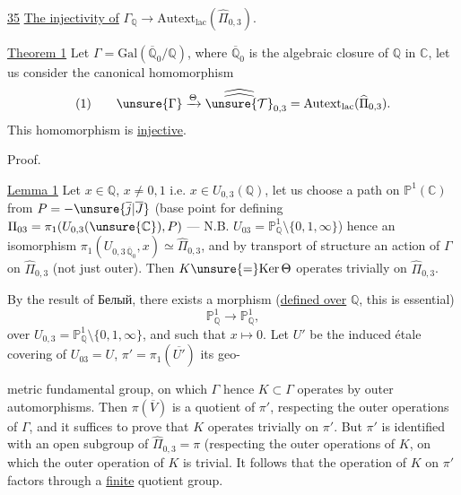 
\uline{35} \uline{The injectivity of} $\Gamma_{\mathbb Q}\longrightarrow\mathrm{Autext}_{\mathrm{lac}}(\widehat{\Pi}_{0,3})$.


\uline{Theorem 1} Let $\Gamma=\mathrm{Gal}(\overline{\mathbb Q}_0/\mathbb Q)$, where $\overline{\mathbb Q}_0$ is the algebraic closure of $\mathbb Q$ in $\mathbb C$, let us consider the canonical homomorphism
\[
(1)\qquad \unsure{\Gamma}\xrightarrow{\Theta}\widehat{\widehat{\unsure{\mathcal T}}}_{0,3}=\mathrm{Autext}_{\mathrm{lac}}(\widehat{\Pi}_{0,3}).
\]
This homomorphism is \uline{injective}.

Proof.

\uline{Lemma 1} Let $x\in\mathbb Q$, $x\ne0,1$ i.e. $x\in U_{0,3}(\mathbb Q)$, let us choose a  path on $\mathbb P^1(\mathbb C)$ from $P=-\unsure{\overline{j}|\overline{J}}$ (base point for defining $\Pi_{03}=\pi_1(U_{0,3}(\unsure{\mathbb C}),P)$ --- N.B. $U_{03}=\mathbb P^1_{\mathbb Q}\setminus\{0,1,\infty\}$) hence an isomorphism $\pi_1(U_{0,3\,\overline{\mathbb Q}_0},x)\simeq\widehat{\Pi}_{0,3}$, and by transport of structure an  action of $\Gamma$ on $\widehat{\Pi}_{0,3}$ (not just outer). Then $K\unsure{=}\mathrm{Ker}\,\Theta$ operates trivially on $\widehat{\Pi}_{0,3}$.

By the result of Белый, there exists a morphism (\uline{defined over} $\mathbb Q$, this is essential)
\[
\mathbb P^1_{\mathbb Q}\longrightarrow\mathbb P^1_{\mathbb Q},
\]
 over $U_{0,3}=\mathbb P^1_{\mathbb Q}\setminus\{0,1,\infty\}$, and such that $x\longmapsto0$. Let $U'$ be the induced étale covering of $U_{03}=U$,  $\pi'=\pi_1(\overline{U'})$ its geo-


metric fundamental group, on which $\Gamma$ hence $K\subset\Gamma$ operates by outer automorphisms. Then $\pi(\overline V)$ is a quotient of $\pi'$, respecting the outer operations of $\Gamma$, and it suffices to prove that $K$ operates trivially on $\pi'$. But $\pi'$ is identified with an open subgroup of $\widehat{\Pi}_{0,3}=\pi$ (respecting the outer operations of $K$, on which the outer operation of $K$ is trivial. It follows that the  operation of $K$ on $\pi'$ factors through a \uline{finite} quotient group.

